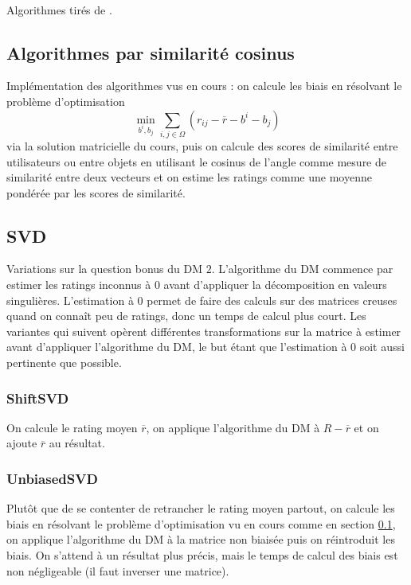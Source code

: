 \documentclass[11pt, openany, a4paper]{article}
\begin{document}
		\
		
		Algorithmes tirés de \cite{Lemire2007}.
	\subsection{Algorithmes par similarité cosinus}
		\label{simCos}
		Implémentation des algorithmes vus en cours : on calcule les biais en résolvant le problème d'optimisation $$\min_{b^i, b_j}\sum_{i,j\in\Omega}(r_{ij} - \overline{r} - b^i - b_j)$$ via la solution matricielle du cours, puis on calcule des scores de similarité entre utilisateurs ou entre objets en utilisant le cosinus de l'angle comme mesure de similarité entre deux vecteurs et on estime les ratings comme une moyenne pondérée par les scores de similarité.
		
	\subsection{SVD}
	Variations sur la question bonus du DM $2$. L'algorithme du DM commence par estimer les ratings inconnus à $0$ avant d'appliquer la décomposition en valeurs singulières. L'estimation à 0 permet de faire des calculs sur des matrices creuses quand on connaît peu de ratings, donc un temps de calcul plus court. Les variantes qui suivent opèrent différentes transformations sur la matrice à estimer avant d'appliquer l'algorithme du DM, le but étant que l'estimation à 0 soit aussi pertinente que possible.

		\subsubsection{ShiftSVD} 
		
		On calcule le rating moyen $\overline{r}$, on applique l'algorithme du DM à $R-\overline{r}$ et on ajoute $\overline{r}$ au résultat.
			
		\subsubsection{UnbiasedSVD}
		
		Plutôt que de se contenter de retrancher le rating moyen partout, on calcule les biais en résolvant le problème d'optimisation vu en cours comme en section \ref{simCos}, on applique l'algorithme du DM à la matrice non biaisée puis on réintroduit les biais.
		On s'attend à un résultat plus précis, mais le temps de calcul des biais est non négligeable (il faut inverser une matrice).
		
\end{document}
